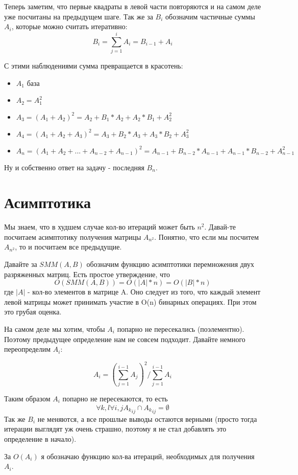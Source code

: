 \documentclass{article}
\begin{document}
Теперь заметим, что первые квадраты в левой части повторяются и на самом деле уже посчитаны на предыдущем шаге. Так же за $B_i$ обозначим частичные суммы $A_i$, которые можно считать итеративно:
\[B_i = \sum_{j=1}^i A_i = B_{i-1} + A_i\]

С этими наблюдениями сумма превращается в красотень:

\begin{itemize}
    \item $A_1$ база
    \item $A_2 = A_1^2$
    \item $A_3 = (A_1 + A_2)^2 = A_2 + B_1*A_2 + A_2*B_1 + A_2^2$
    \item $A_4 = (A_1 + A_2 + A_3)^2 = A_3 + B_2*A_3 + A_3*B_2 + A_3^2$
    \item $A_n = (A_1 + A_2 +...+ A_{n-2} + A_{n-1})^2 = A_{n-1} + B_{n-2}*A_{n-1} + A_{n-1}*B_{n-2} + A_{n-1}^2$
\end{itemize}

Ну и собственно ответ на задачу - последняя $B_n$.

\section{Асимптотика}
Мы знаем, что в худшем случае кол-во итераций может быть $n^2$. Давай-те посчитаем асимптотику получения матрицы $A_{n^2}$. Понятно, что если мы посчитем $A_{n^2}$, то и посчитаем все предыдущие.

Давайте за $SMM(A, B)$ обозначим функцию асимптотики перемножения двух разряженных матриц. Есть простое утверждение, что
\[O(SMM(A, B)) = O(|A|*n) = O(|B|*n)\]
где $|A|$ - кол-во элементов в матрице A. Оно следует из того, что каждый элемент левой матрицы может принимать участие в O(n) бинарных операциях.
При этом это грубая оценка.

На самом деле мы хотим, чтобы $A_i$ попарно не пересекались (поэлементно). Поэтому предыдущее определение нам не совсем подходит. Давайте немного переопределим $A_i$:

\[A_i = (\sum_{j=1}^{i-1}A_{j})^2 / \sum_{j=1}^{i-1} A_i\]

Таким образом $A_i$ попарно не пересекаются, то есть
\[\forall k, l \forall i, j {A_k}_{ij} \cap {A_k}_{ij} = \emptyset \]
Так же $B_i$ не меняются, а все прошлые выводы остаются верными (просто тогда итерации выглядят уж очень страшно, поэтому я не стал добавлять это определение в начало).

За $O(A_i)$ я обозначаю функцию кол-ва итераций, необходимых для получения $A_i$.
\end{document}
